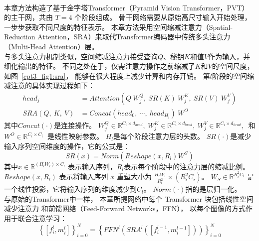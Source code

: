 \\
%
%
%
%
\indent
本章方法构造了基于金字塔Transformer（Pyramid Vision Transformer，PVT）
的主干网，共由 $T = 4$ 个阶段组成。 
骨干网络需要从原始高尺寸输入开始处理，一步步获取不同尺度的特征表示。
本章方法采用空间缩减注意力（Spatial-Reduction Attention，SRA）来取代Transformer编码器中传统多头注意力（Multi-Head Attention）层。
\\
%
%
%
%
\indent
与多头注意力机制类似，空间缩减注意力接受查询$Q$、秘钥$K$和值$V$作为输入，并细化输出的特征。
不同之处在于，仅需注意力操作之前缩减了$K$和$V$的空间尺度，如图~\ref{cpt3_fig1:sra}，
能够在很大程度上减少计算和内存开销。
第$l$阶段的空间缩减注意的具体实现过程如下：
%
%
%
\begin{equation}
	\begin{aligned}
		head_{j} &= Attention(Q~W_{j}^{Q}, ~ SR(K)~W_{j}^{K},~ SR(V)~W_{j}^{V})\\
		SRA(Q,~K,~V) &= Concat(head_{0},~ \cdots,~ head_{H_{l}})~W^{O}
	\end{aligned}
\end{equation}
%
%
%
%
%
%
%
其中$Concat(\cdot)$是连接操作。
$W_{j}^{Q} \in \mathbb{R}^{C_{i} \times d_{head}},~
W_{j}^{K} \in \mathbb{R}^{C_{i} \times d_{head}},~
W_{j}^{V} \in \mathbb{R}^{C_{i} \times d_{head}},~$
和
$W^{O} \in \mathbb{R}^{C_{i} \times C_{i}}~$
是线性映射参数。
$H_{l}$是每个阶段注意力层的头数。
$SR(\cdot)$是减少输入序列空间维度的操作，它的公式是：
%
%
%
\begin{equation}
	SR(x) = Norm(Reshape(x, R_{l})W^{S})
\end{equation}
%
%
其中$x \in \mathbb{R}^{(H_{l}W_{l}) \times C_{l}} $
表示输入序列，$R_{l}$表示每个阶段中的注意力层的缩减比例。
$Reshape(x, R_{l})$ 表示将输入序列 $x$ 重塑大小为
$\frac{H_{l}W_{l}}{R_{i}^{2}} \times (R_{i}^{2}C_{i})$。
$W_{S} \in \mathbb{R}^{R_{i}^{2}C_{i}}$
是一个线性投影，它将输入序列的维度减少到$C_{l}$。
$Norm(\cdot)$指的是层归一化。
\\
%
%
%
%
\indent
与原始的Transformer中一样，
本章所提网络中每个 Transformer 块包括线性空间减少注意力 
和前馈网络（Feed-Forward Networks，FFN），
以每个图像的方式作用于联合注意学习：
\begin{equation}
	\left \{ [f_{i}^{l}, m_{i}^{l}]\right \}_{i=0}^{N} = \left \{ FFN^{l} \left  ( SRA^{l} \left ( [f_{i}^{l-1}, m_{i}^{l-1}]\right )\right )\right \}_{i=0}^{N}
\end{equation}
